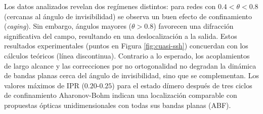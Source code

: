 Los datos analizados revelan dos regímenes distintos: para redes con $0.4 < \theta < 0.8$ (cercanas al ángulo de invisibilidad) se observa un buen efecto de confinamiento (\emph{caging}). Sin embargo, ángulos mayores ($\theta > 0.8$) favorecen una difracción significativa del campo, resultando en una deslocalización a la salida. Estos resultados experimentales (puntos en Figura \ref{fig:cuasi-ssh}) concuerdan con los cálculos teóricos (línea discontinua). Contrario a lo esperado, los acoplamientos de largo alcance y las correcciones por no ortogonalidad no degradan la dinámica de bandas planas cerca del ángulo de invisibilidad, sino que se complementan. Los valores máximos de IPR ($0.20$-$0.25$) para el estado dímero después de tres ciclos de confinamiento Aharonov-Bohm indican una localización comparable con propuestas ópticas unidimensionales con todas sus bandas planas (ABF). 